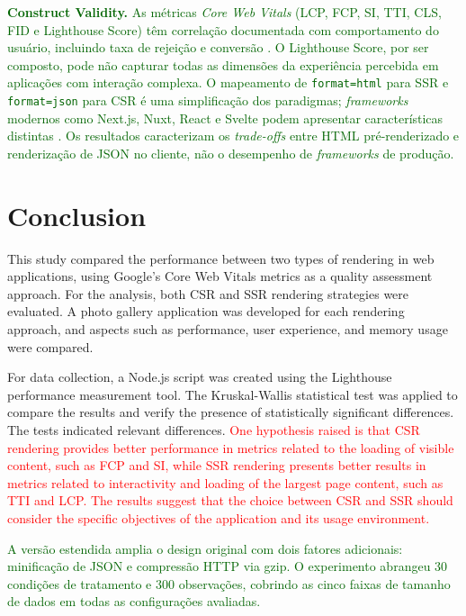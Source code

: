 \documentclass{sbc2019}%
\newcommand{\todo}[1]{\textcolor{red}{#1}}
\begin{document}
\textbf{\textcolor{darkgreen}{Construct Validity.}}
\textcolor{darkgreen}{As métricas \textit{Core Web Vitals} (LCP, FCP, SI, TTI, CLS, FID e Lighthouse Score) têm correlação documentada com comportamento do usuário, incluindo taxa de rejeição e conversão \cite{sikder:2016}. O Lighthouse Score, por ser composto, pode não capturar todas as dimensões da experiência percebida em aplicações com interação complexa. O mapeamento de \texttt{format=html} para SSR e \texttt{format=json} para CSR é uma simplificação dos paradigmas; \textit{frameworks} modernos como Next.js, Nuxt, React e Svelte podem apresentar características distintas \cite{ollila:2021}. Os resultados caracterizam os \textit{trade-offs} entre HTML pré-renderizado e renderização de JSON no cliente, não o desempenho de \textit{frameworks} de produção.}



\section{Conclusion}\label{sec:conclusion}

This study compared the performance between two types of rendering in web applications, using Google's Core Web Vitals metrics as a quality assessment approach. For the analysis, both CSR and SSR rendering strategies were evaluated. A photo gallery application was developed for each rendering approach, and aspects such as performance, user experience, and memory usage were compared.

For data collection, a Node.js script was created using the Lighthouse performance measurement tool. The Kruskal-Wallis statistical test was applied to compare the results and verify the presence of statistically significant differences. The tests indicated relevant differences. \todo{One hypothesis raised is that CSR rendering provides better performance in metrics related to the loading of visible content, such as FCP and SI, while SSR rendering presents better results in metrics related to interactivity and loading of the largest page content, such as TTI and LCP. The results suggest that the choice between CSR and SSR should consider the specific objectives of the application and its usage environment.}

\textcolor{darkgreen}{A versão estendida amplia o design original com dois fatores adicionais: minificação de JSON e compressão HTTP via gzip. O experimento abrangeu 30 condições de tratamento e 300 observações, cobrindo as cinco faixas de tamanho de dados em todas as configurações avaliadas.}
\end{document}
